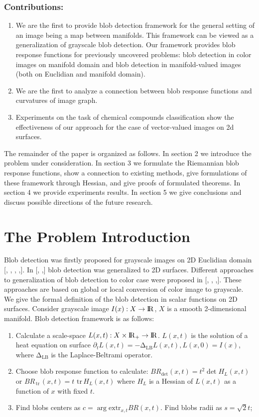 \documentclass{llncs}
\newcommand{\LaplaceBeltrami}{\mathrm{\Delta_{{LB}}}}
\newcommand{\partderiv}[2]{\partial_{#2} {#1}}
\newcommand{\extr}[1]{\mathrm{extr}_{#1}}
\newcommand{\toreal}{\rightarrow\bbbr}
\newcommand {\tr}{{\,}\mathrm{tr}{\,}}
\begin{document}
\subsubsection{Contributions:}
\begin{enumerate}
\item We are the first to provide blob detection framework for the general setting of an image being a map between manifolds. This framework can be viewed as a generalization of grayscale blob detection. Our framework provides blob response functions for previously uncovered problems: blob detection in color images on manifold domain and blob detection in manifold-valued images (both on Euclidian and manifold domain). 
\item We are the first to analyze a connection between blob response functions and curvatures of image graph.
\item Experiments on the task of chemical compounds classification show the effectiveness of our approach for the case of vector-valued images on 2d surfaces.  
\end{enumerate}

The remainder of the paper is organized as follows. In section 2 we introduce the problem under consideration. In section 3 we formulate the Riemannian blob response functions, show a connection to existing methods, give formulations of these framework through Hessian, and give proofs of formulated theorems. In section 4 we provide experiments results. In section 5 we give conclusions and discuss possible directions of the future research.

\section{The Problem Introduction}
Blob detection was firstly proposed for grayscale images on 2D Euclidian domain [, , , ,]. In [, ,] blob detection was generalized to 2D surfaces. Different approaches to generalization of blob detection to color case were proposed in [, , ,]. These approaches are based on global or local conversion of color image to grayscale.
\\
We give the formal definition of the blob detection in scalar functions on 2D surfaces.
Consider grayscale image $I(x):X \toreal$, $X$ is a smooth 2-dimensional manifold. Blob detection framework is as follows:
\begin{enumerate} 
\item Calculate a scale-space $L(x,t):X\times \bbbr_{+} \toreal$. $L(x,t)$ is the solution of a heat equation  on surface
  $\partderiv{L(x, t)}{t}=-\LaplaceBeltrami{ L(x, t)},L(x, 0)=I(x)$, where $\LaplaceBeltrami$ is the Laplace-Beltrami operator.
\item Choose blob response function to calculate: $BR_{\det}(x, t)=t^2 \det{H_L(x,t)}$ or $BR_{\tr}(x, t)=t\, \tr {H_L(x,t)}$ where $H_L$ is a Hessian of $L(x, t)$ as a function of $x$ with fixed $t$.
\item Find blobs centers as $c=\arg \extr{x,t} BR(x, t)$. Find blobs radii as $s=\sqrt{2} t$;
\end{enumerate}
\end{document}
